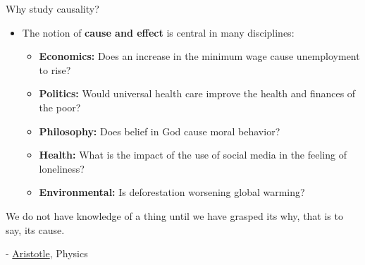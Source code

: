 \documentclass[aspectratio=169]{beamer}
\begin{document}
\begin{frame}{Why study causality?}

\begin{itemize}
    \item The notion of \textbf{cause and effect} is central in many disciplines: 
    \begin{itemize}
        \item[$\bullet$] \textbf{Economics:} Does an increase in the minimum wage cause unemployment to rise?
        \item[$\bullet$] \textbf{Politics:} Would universal health care improve the health and finances of the poor?
        \item[$\bullet$] \textbf{Philosophy:} Does belief in God cause moral behavior?
        \item[$\bullet$] \textbf{Health:} What is the impact of the use of social media in the feeling of loneliness?
        \item[$\bullet$] \textbf{Environmental:} Is deforestation worsening global warming?
    \end{itemize}
\end{itemize}
\vspace{0.3cm}

\begin{center}
        \begin{tcolorbox}[enhanced,sharp corners,
            width=8.8cm,
            colback=white,
            overlay={
                \node[anchor=north west,fill=white,draw=white,circle,inner sep=1pt] 
                at ([xshift=-0.17cm,yshift=0.2cm]frame.north west) {\faQuoteLeft};
                \node[anchor=south east,fill=white,draw=white,circle,inner sep=1pt] 
                at ([xshift=0.17cm,yshift=-0.2cm]frame.south east) {\faQuoteRight};
            }
            ]
            We do not have knowledge of a thing until we have grasped its why, that is to say, its cause. \\
            \vspace{0cm}

            {\small - \href{https://plato.stanford.edu/archives/spr2019/entries/aristotle-causality}{Aristotle}, Physics}
        \end{tcolorbox}
        \end{center}

\end{frame}
\end{document}
